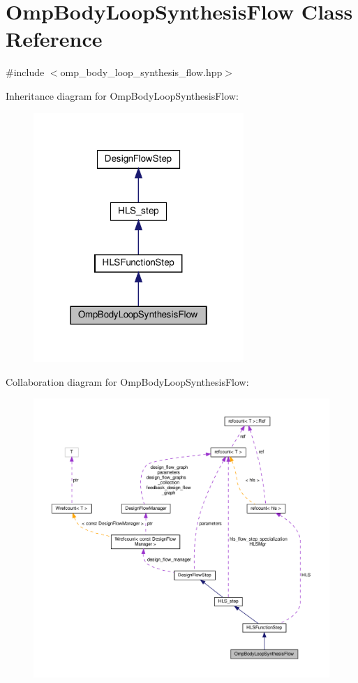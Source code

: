 \hypertarget{classOmpBodyLoopSynthesisFlow}{}\section{Omp\+Body\+Loop\+Synthesis\+Flow Class Reference}
\label{classOmpBodyLoopSynthesisFlow}


{\ttfamily \#include $<$omp\+\_\+body\+\_\+loop\+\_\+synthesis\+\_\+flow.\+hpp$>$}



Inheritance diagram for Omp\+Body\+Loop\+Synthesis\+Flow\+:
\nopagebreak
\begin{figure}[H]
\begin{center}
\leavevmode
\includegraphics[width=226pt]{db/d68/classOmpBodyLoopSynthesisFlow__inherit__graph}
\end{center}
\end{figure}


Collaboration diagram for Omp\+Body\+Loop\+Synthesis\+Flow\+:
\nopagebreak
\begin{figure}[H]
\begin{center}
\leavevmode
\includegraphics[width=350pt]{d9/d55/classOmpBodyLoopSynthesisFlow__coll__graph}
\end{center}
\end{figure}
